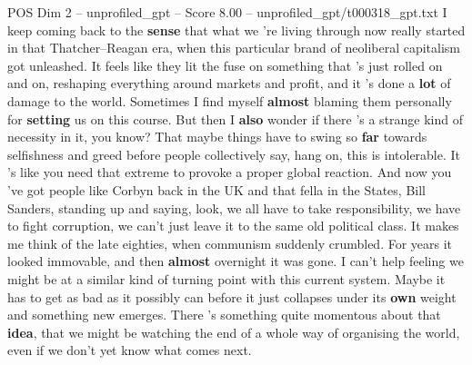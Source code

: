 \begin{textsample}{POS Dim 2 – unprofiled\_gpt – Score 8.00 – unprofiled\_gpt/t000318\_gpt.txt}  \label{ex:f2_pos_023}
I keep coming back to the \textbf{sense} that what we ’re living through now really started in that Thatcher–Reagan era, when this particular brand of neoliberal capitalism got unleashed.
It feels like they lit the fuse on something that ’s just rolled on and on, reshaping everything around markets and profit, and it ’s done a \textbf{lot} of damage to the world.
Sometimes I find myself \textbf{almost} blaming them personally for \textbf{setting} us on this course.
But then I \textbf{also} wonder if there ’s a strange kind of necessity in it, you know?
That maybe things have to swing so \textbf{far} towards selfishness and greed before people collectively say, hang on, this is intolerable.
It ’s like you need that extreme to provoke a proper global reaction.
And now you ’ve got people like Corbyn back in the UK and that fella in the States, Bill Sanders, standing up and saying, look, we all have to take responsibility, we have to fight corruption, we can't just leave it to the same old political class.
It makes me think of the late eighties, when communism suddenly crumbled.
For years it looked immovable, and then \textbf{almost} overnight it was gone.
I can't help feeling we might be at a similar kind of turning point with this current system.
Maybe it has to get as bad as it possibly can before it just collapses under its \textbf{own} weight and something new emerges.
There ’s something quite momentous about that \textbf{idea}, that we might be watching the end of a whole way of organising the world, even if we don't yet know what comes next.

\end{textsample}
